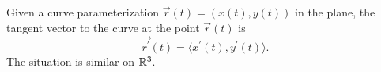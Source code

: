 \begin{definition}
	Given a curve parameterization $\vec{r}(t) = (x(t), y(t))$ in the plane, the
	tangent vector to the curve at the point $\vec{r}(t)$ is
	\[
		\vec{r^\prime}(t) = \langle x^\prime(t), y^\prime(t) \rangle.
	\]
	The situation is similar on ${\mathbb{R}}^3$.
\end{definition}

